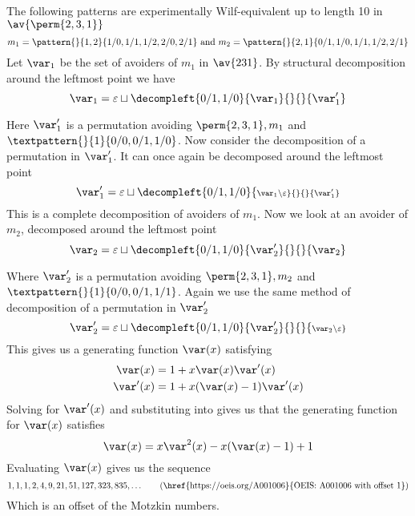 \subsection{}
\nextvar
The following patterns are experimentally Wilf-equivalent up to length 10 in
\(\av{\perm{2,3,1}}\)
\begin{equation*}
    m_1 = \pattern{}{1,2}{1/0,1/1,1/2,2/0,2/1} \text{ and }
    m_2 = \pattern{}{2,1}{0/1,1/0,1/1,1/2,2/1}
\end{equation*}
Let \(\scriptvar_1\) be the set of avoiders of \(m_1\) in \(\av{231}\). By structural decomposition
around the leftmost point we have
\begin{equation*}
    \scriptvar_1 = \varepsilon \sqcup
    \decompleft{0/1,1/0}{\scriptvar_1}{}{}{\scriptvar^\prime_1}
\end{equation*}

\noindent
Here \(\scriptvar^\prime_1\) is a permutation avoiding \(\perm{2,3,1}, m_1\)
and \(\textpattern{}{1}{0/0,0/1,1/0}\).
Now consider the decomposition of a permutation in \(\scriptvar^\prime_1\). It can
once again be decomposed around the leftmost point
\begin{equation*}
    \scriptvar^\prime_1 = \varepsilon \sqcup
    \decompleft{0/1,1/0}{\scriptstyle \scriptvar_1\setminus\varepsilon}{}{}{\scriptvar^\prime_1}
\end{equation*}
This is a complete decomposition of avoiders of \(m_1\). Now we
look at an avoider of \(m_2\), decomposed around the leftmost point
\begin{equation*}
    \scriptvar_2 = \varepsilon \sqcup
    \decompleft{0/1,1/0}{\scriptvar^\prime_2}{}{}{\scriptvar_2}
\end{equation*}

Where \(\scriptvar^\prime_2\) is a permutation avoiding \(\perm{2,3,1}, m_2\)
and \(\textpattern{}{1}{0/0,0/1,1/1}\).
Again we use the same method of decomposition of a permutation in \(\scriptvar^\prime_2\)
\begin{equation*}
    \scriptvar^\prime_2 = \varepsilon \sqcup
    \decompleft{0/1,1/0}{\scriptvar^\prime_2}{}{}{\scriptstyle \scriptvar_2\setminus\varepsilon}
\end{equation*}
This gives us a generating function \(\var(x)\) satisfying
\begin{align}
    \var(x) &= 1 + x\var(x)\var^\prime(x) \label{eqn:Pgen}\\
    \var^\prime(x) &= 1 + x(\var(x)-1)\var^\prime(x)\label{eqn:PprimeGen}
\end{align}
Solving  for \(\var^\prime(x)\) and substituting into
 gives us that the generating function for
\(\var(x)\) satisfies
\begin{equation}
    \var(x) = x\var^2(x) - x(\var(x) - 1) + 1
\end{equation}
Evaluating \(\var(x)\) gives us the sequence
\begin{equation*}
    1, 1, 1, 2, 4, 9, 21, 51, 127, 323, 835,\dotsc \tag{\href{https://oeis.org/A001006}{OEIS: A001006 with offset 1}}
\end{equation*}
Which is an offset of the Motzkin numbers.

